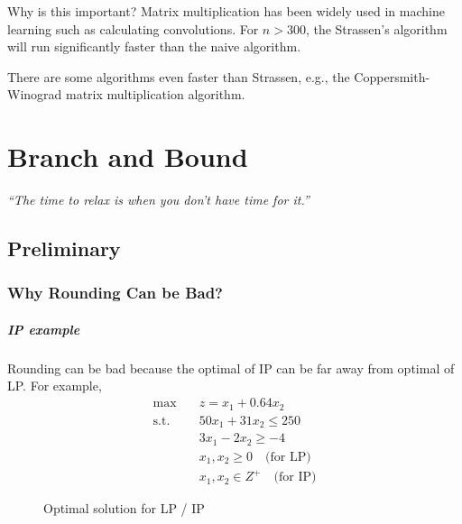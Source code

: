                     Why is this important? Matrix multiplication has been widely used in machine learning such as calculating convolutions. For $n > 300$, the Strassen's algorithm will run significantly faster than the naive algorithm.

                    There are some algorithms even faster than Strassen, e.g., the Coppersmith-Winograd matrix multiplication algorithm.

    \chapter{Branch and Bound}
        \begin{center}
            \textit{``The time to relax is when you don't have time for it.''}
        \end{center}

        \section{Preliminary}
            \subsection{Why Rounding Can be Bad?}
                \paragraph{IP example}
                    Rounding can be bad because the optimal of IP can be far away from optimal of LP. For example,
                    \begin{align*}
                        \text{max} \quad & z=x_1 +0.64x_2  \\
                        \text{s.t.} \quad & 50x_1 +31x_2 \le 250  \\
                                    & 3x_1-2x_2\ge -4  \\
                                    & x_1,x_2\ge 0 \quad \text{(for LP)}\\
                                    & x_1,x_2 \in Z^+ \quad \text{(for IP)} 
                    \end{align*}
                    \begin{figure}[H]
                        \centering
                        \caption{Optimal solution for LP / IP}
                    \end{figure}

